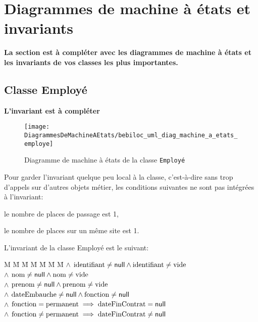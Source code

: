 \documentclass[11pt,article]{article}
\newcommand{\nullvalue}{\textsf{null}\xspace}
\begin{document}
\newpage

\section{Diagrammes de machine à états et invariants}

{\color{red}\textbf{La section est à compléter avec les diagrammes de
    machine à états et les invariants de vos classes les plus
    importantes.}}

\subsection{Classe \textsf{Employé}}

\textbf{\color{red}L'invariant est à compléter}

\begin{figure}[ht!]
\begin{center}
\texttt{[image: DiagrammesDeMachineAEtats/bebiloc\_uml\_diag\_machine\_a\_etats\_employe]}
\caption{Diagramme de machine à états de la classe \texttt{Employé}}
\end{center}
\label{umlet_diag_machine_a_etats_employe}
\end{figure}

Pour garder l'invariant quelque peu local à la classe, c'est-à-dire
sans trop d'appels sur d'autres objets métier, les conditions
suivantes ne sont pas intégrées à l'invariant:
\begin{compactitem}
\item le nombre de places de passage est 1,
\item le nombre de places sur un même site est 1.
\end{compactitem}

\bigskip

\newcommand{\identifiant}{\ensuremath\mathrm{identifiant}}
\newcommand{\nom}{\ensuremath\mathrm{nom}}
\newcommand{\prenom}{\ensuremath\mathrm{prenom}}
\newcommand{\dateEmbauche}{\ensuremath\mathrm{dateEmbauche}}
\newcommand{\dateFinContrat}{\ensuremath\mathrm{dateFinContrat}}
\newcommand{\fonction}{\ensuremath\mathrm{fonction}}
\newcommand{\permanent}{\ensuremath\mathrm{permanent}}
\newcommand{\nonpermanent}{\ensuremath\mathrm{non-permanent}}
\newcommand{\emptystring}{\ensuremath\mathrm{vide}}
L'invariant de la classe \textsf{Employé} est le suivant:
\begin{tabbing}
M \= M \= M \= M \= M \= M \= M \kill
\> $\land$ \> $\identifiant \neq \nullvalue \land \identifiant \neq \emptystring$\\
\> $\land$ \> $\nom \neq \nullvalue \land \nom \neq \emptystring$\\
\> $\land$ \> $\prenom \neq \nullvalue \land \prenom \neq \emptystring$\\
\> $\land$ \> $\dateEmbauche \neq \nullvalue \land \fonction \neq \nullvalue$\\
\> $\land$ \> $\fonction = \permanent \implies \dateFinContrat = \nullvalue$\\
\> $\land$ \> $\fonction \neq \permanent \implies \dateFinContrat \neq \nullvalue$\\
\end{tabbing}
\end{document}
